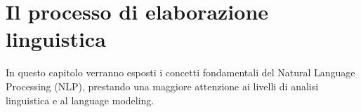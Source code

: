 \chapter{Il processo di elaborazione linguistica}
In questo capitolo verranno esposti i concetti fondamentali del Natural Language Processing (NLP), prestando una maggiore attenzione ai livelli di analisi linguistica e al language modeling.




